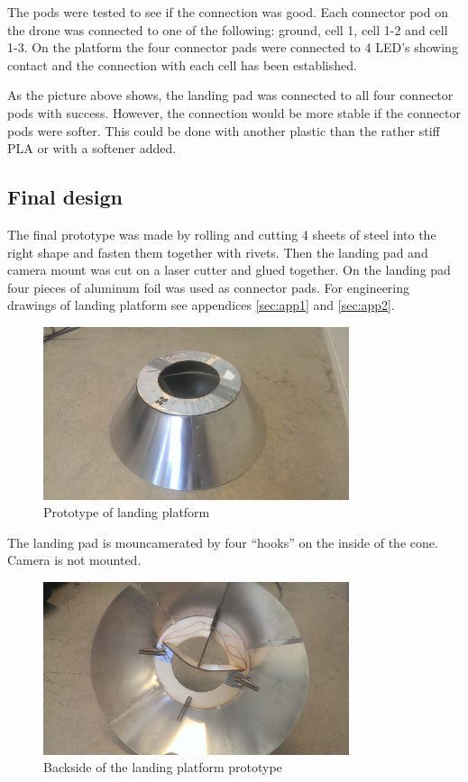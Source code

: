 The pods were tested to see if the connection was good. Each connector pod on the drone was connected to one of the following: ground, cell 1, cell 1-2 and cell 1-3. On the platform the four connector pads were connected to 4 LED's showing contact and the connection with each cell has been established.

As the picture above shows, the landing pad was connected to all four connector pods with success. However, the connection would be more stable if the connector pods were softer. This could be done with another plastic than the rather stiff PLA or with a softener added.

\subsection{Final design}
The final prototype was made by rolling and cutting 4 sheets of steel into the right shape and fasten them together with rivets. Then the landing pad and camera mount was cut on a laser cutter and glued together. On the landing pad four pieces of aluminum foil was used as connector pads. For engineering drawings of landing platform see appendices \ref{sec:app1} and \ref{sec:app2}.

\begin{figure}
	\centering
	\includegraphics[width=0.8\textwidth]{imgs/cone_naked}
	\caption{Prototype of landing platform}
\end{figure}

The landing pad is mouncamerated by four “hooks” on the inside of the cone. Camera is not mounted.

\begin{figure}
	\centering
	\includegraphics[width=0.8\textwidth]{imgs/cone_inside}
	\caption{Backside of the landing platform prototype}
\end{figure}

